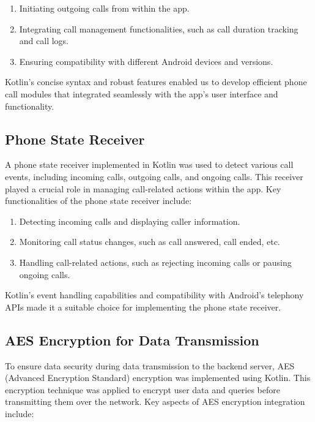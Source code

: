 \begin{enumerate}
  \item Initiating outgoing calls from within the app.
  \item Integrating call management functionalities, such as call duration tracking and call logs.
  \item Ensuring compatibility with different Android devices and versions.
\end{enumerate}

Kotlin's concise syntax and robust features enabled us to develop efficient phone call modules that integrated seamlessly with the app's user interface and functionality.

\subsection{Phone State Receiver}

A phone state receiver implemented in Kotlin was used to detect various call events, including incoming calls, outgoing calls, and ongoing calls. This receiver played a crucial role in managing call-related actions within the app. Key functionalities of the phone state receiver include:

\begin{enumerate}
  \item Detecting incoming calls and displaying caller information.
  \item Monitoring call status changes, such as call answered, call ended, etc.
  \item Handling call-related actions, such as rejecting incoming calls or pausing ongoing calls.
\end{enumerate}

Kotlin's event handling capabilities and compatibility with Android's telephony APIs made it a suitable choice for implementing the phone state receiver.

\subsection{AES Encryption for Data Transmission}

To ensure data security during data transmission to the backend server, AES (Advanced Encryption Standard) encryption was implemented using Kotlin. This encryption technique was applied to encrypt user data and queries before transmitting them over the network. Key aspects of AES encryption integration include:

